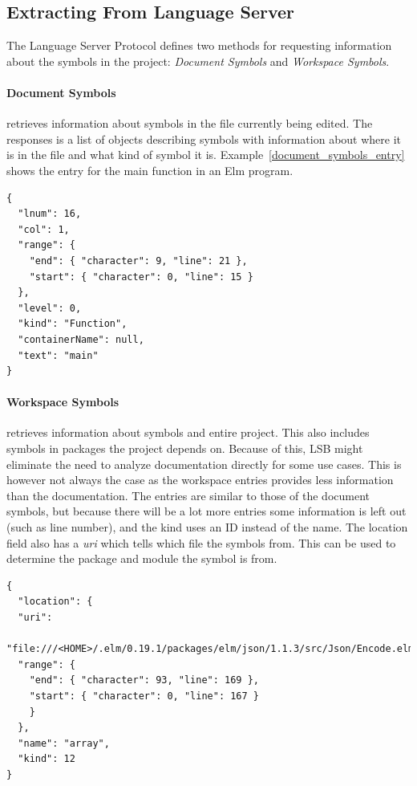 \documentclass[../thesis.tex]{subfiles}
\begin{document}
\subsection{Extracting From Language Server}%
The Language Server Protocol defines two methods for requesting information about the symbols in the project: \textit{Document Symbols} and \textit{Workspace Symbols}.

\paragraph{Document Symbols} retrieves information about symbols in the file currently being edited.
The responses is a list of objects describing symbols with information about where it is in the file
and what kind of symbol it is. Example~\ref{document_symbols_entry} shows the entry for the main function in an Elm program.
\begin{example}\label{document_symbols_entry}
\begin{verbatim}
{
  "lnum": 16,
  "col": 1,
  "range": {
    "end": { "character": 9, "line": 21 },
    "start": { "character": 0, "line": 15 }
  },
  "level": 0,
  "kind": "Function",
  "containerName": null,
  "text": "main"
} 
\end{verbatim}
\end{example}

\paragraph{Workspace Symbols} retrieves information about symbols and entire project.
This also includes symbols in packages the project depends on.
Because of this, LSB might eliminate the need to analyze documentation directly for some use cases.
This is however not always the case as the workspace entries provides less information than the documentation.
The entries are similar to those of the document symbols, but because there will be a lot more entries some
information is left out (such as line number), and the kind uses an ID instead of the name.
The location field also has a \textit{uri} which tells which file the symbols from.
This can be used to determine the package and module the symbol is from.
\begin{example}
\begin{verbatim}
{ 
  "location": {
  "uri":
    "file:///<HOME>/.elm/0.19.1/packages/elm/json/1.1.3/src/Json/Encode.elm",
  "range": {
    "end": { "character": 93, "line": 169 },
    "start": { "character": 0, "line": 167 }
    }
  },
  "name": "array",
  "kind": 12 
}
\end{verbatim} 
\end{example}
\end{document}
